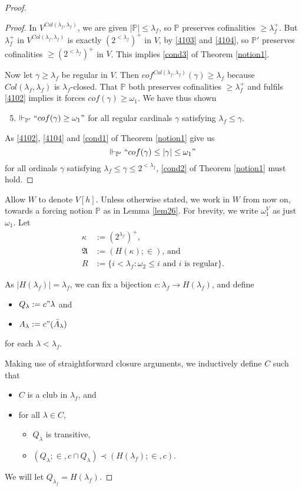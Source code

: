 \documentclass[12pt]{article}
\numberwithin{equation}{section}
\begin{document}
\begin{proof}
\begin{proof}
In $V^{Col(\lambda_f, \lambda_f)}$, we are given $|\mathbb{P}| \leq \lambda_f$, so $\mathbb{P}$ preserves cofinalities $\geq \lambda_f^+$. But $\lambda_f^+$ in $V^{Col(\lambda_f, \lambda_f)}$ is exactly $(2^{< \lambda_f})^+$ in $V$, by \ref{4103} and \ref{4104}, so $\mathbb{P}'$ preserves cofinalities $\geq (2^{< \lambda_f})^+$ in $V$. This implies \ref{cond3} of Theorem  \ref{notion1}.

Now let $\gamma \geq \lambda_f$ be regular in $V$. Then $cof^{Col(\lambda_f, \lambda_f)} (\gamma) \geq \lambda_f$ because $Col(\lambda_f, \lambda_f)$ is $\lambda_f$-closed. That $\mathbb{P}$ both preserves cofinalities $\geq \lambda_f^+$ and fulfils \ref{4102} implies it forces $cof(\gamma) \geq \omega_1$. We have thus shown
\begin{enumerate}[label=(\arabic*')]
    \setcounter{enumi}{4}
    \item\label{4105} $\Vdash_{\mathbb{P}'} ``cof(\gamma) \geq \omega_1"$ for all regular cardinals $\gamma$ satisfying $\lambda_f \leq \gamma$.
\end{enumerate}
As \ref{4102}, \ref{4104} and \ref{cond1} of Theorem \ref{notion1} give us $$\Vdash_{\mathbb{P}'} ``cof(\gamma) \leq |\gamma| \leq \omega_1"$$ for all ordinals $\gamma$ satisfying $\lambda_f \leq \gamma \leq 2^{< \lambda_f}$, \ref{cond2} of Theorem \ref{notion1} must hold.
\end{proof}

Allow $W$ to denote $V[h]$. Unless otherwise stated, we work in $W$ from now on, towards a forcing notion $\mathbb{P}$ as in Lemma \ref{lem26}. For brevity, we write $\omega_1^V$ as just $\omega_1$. Let 
\begin{align*}
    \kappa & := (2^{\lambda_f})^+ \text{,} \\
    \mathfrak{A} & := (H(\kappa); \in) \text{, and} \\
    R & := \{i < \lambda_f : \omega_2 \leq i \text{ and } i \text{ is regular}\}.
\end{align*}

As $|H(\lambda_f)| = \lambda_f$, we can fix a bijection $c : \lambda_f \longrightarrow H(\lambda_f)$, and define
\begin{itemize}
    \item\label{a3} $Q_{\lambda} := c" \lambda$ and
    \item\label{a4} $A_{\lambda} := c" (\bar{A}_{\lambda})$
\end{itemize}
for each $\lambda < \lambda_f$.

Making use of straightforward closure arguments, we inductively define $C$ such that 
\begin{itemize}
    \item $C$ is a club in $\lambda_f$, and
    \item for all $\lambda \in C$, 
    \begin{itemize}[label=$\circ$]
        \item $Q_{\lambda}$ is transitive,
        \item $(Q_{\lambda}; \in, c \cap Q_{\lambda}) \prec (H(\lambda_f); \in, c)$.
    \end{itemize}
\end{itemize}
We will let $Q_{\lambda_f} = H(\lambda_f)$.


\end{proof}
\end{document}

